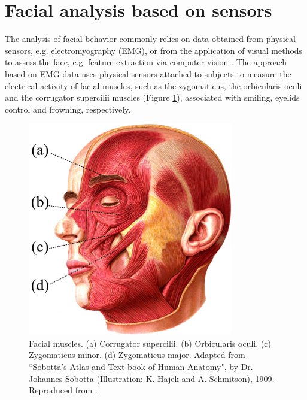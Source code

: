 \section{Facial analysis based on sensors}

The analysis of facial behavior commonly relies on data obtained from physical sensors, e.g. electromyography (EMG), or from the application of visual methods to assess the face, e.g. feature extraction via computer vision \parencite{schrader2017rising}. The approach based on EMG data uses physical sensors attached to subjects to measure the electrical activity of facial muscles, such as the zygomaticus, the orbicularis oculi and the corrugator supercilii muscles (Figure \ref{fig:face-muscles}), associated with smiling, eyelids control and frowning, respectively.

\begin{figure}[h!]
\centering
\includegraphics[width=0.8\textwidth]{Content/figures/face-muscles.jpg}
\caption{Facial muscles. (a) Corrugator supercilii. (b) Orbicularis oculi. (c) Zygomaticus minor. (d) Zygomaticus major. Adapted from ``Sobotta's Atlas and Text-book of Human Anatomy", by Dr. Johannes Sobotta (Illustration: K. Hajek and A. Schmitson), 1909. Reproduced from \parencite{sobotta1909wikimedia}.}
\label{fig:face-muscles}
\end{figure}

